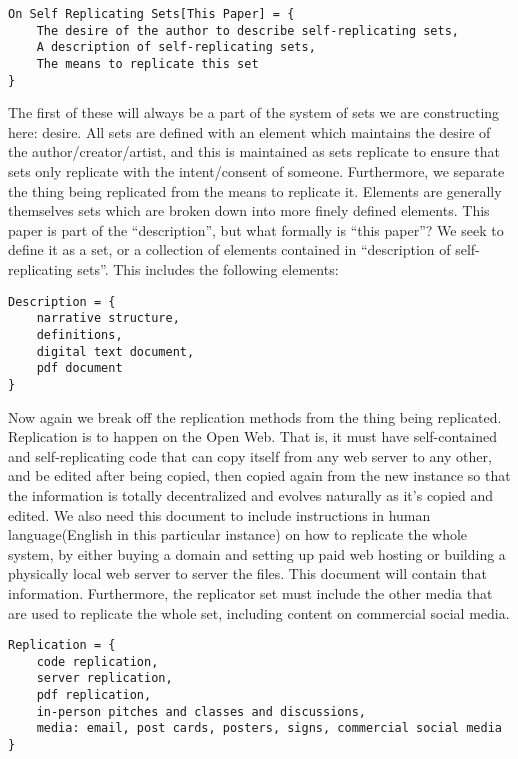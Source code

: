 \documentclass[12pt,a4paper]{amsart}
\numberwithin{equation}{section}
\begin{document}
\begin{verbatim}
On Self Replicating Sets[This Paper] = {
    The desire of the author to describe self-replicating sets,
    A description of self-replicating sets,
    The means to replicate this set
}
\end{verbatim}

The first of these will always be a part of the system of sets we are
constructing here: desire. All sets are defined with an element which
maintains the desire of the author/creator/artist, and this is
maintained as sets replicate to ensure that sets only replicate with the
intent/consent of someone. Furthermore, we separate the thing being
replicated from the means to replicate it. Elements are generally
themselves sets which are broken down into more finely defined elements.
This paper is part of the ``description'', but what formally is ``this
paper''? We seek to define it as a set, or a collection of elements
contained in ``description of self-replicating sets''. This includes the
following elements:

\begin{verbatim}
Description = {
    narrative structure,
    definitions,
    digital text document,
    pdf document
}
\end{verbatim}

Now again we break off the replication methods from the thing being
replicated. Replication is to happen on the Open Web. That is, it must
have self-contained and self-replicating code that can copy itself from
any web server to any other, and be edited after being copied, then
copied again from the new instance so that the information is totally
decentralized and evolves naturally as it's copied and edited. We also
need this document to include instructions in human language(English in
this particular instance) on how to replicate the whole system, by
either buying a domain and setting up paid web hosting or building a
physically local web server to server the files. This document will
contain that information. Furthermore, the replicator set must include
the other media that are used to replicate the whole set, including
content on commercial social media.

\begin{verbatim}
Replication = {
    code replication,
    server replication,
    pdf replication,
    in-person pitches and classes and discussions,
    media: email, post cards, posters, signs, commercial social media
}
\end{verbatim}
\end{document}
